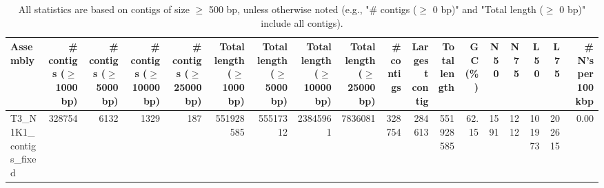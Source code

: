 \documentclass[12pt,a4paper]{article}
\begin{document}
\begin{table}[ht]
\begin{center}
\caption{All statistics are based on contigs of size $\geq$ 500 bp, unless otherwise noted (e.g., "\# contigs ($\geq$ 0 bp)" and "Total length ($\geq$ 0 bp)" include all contigs).}
\begin{tabular}{|l*{17}{|r}|}
\hline
Assembly & \# contigs ($\geq$ 1000 bp) & \# contigs ($\geq$ 5000 bp) & \# contigs ($\geq$ 10000 bp) & \# contigs ($\geq$ 25000 bp) & Total length ($\geq$ 1000 bp) & Total length ($\geq$ 5000 bp) & Total length ($\geq$ 10000 bp) & Total length ($\geq$ 25000 bp) & \# contigs & Largest contig & Total length & GC (\%) & N50 & N75 & L50 & L75 & \# N's per 100 kbp \\ \hline
T3\_N1K1\_contigs\_fixed & 328754 & 6132 & 1329 & 187 & 551928585 & 55517312 & 23845961 & 7836081 & 328754 & 284613 & 551928585 & 62.15 & 1591 & 1212 & 101973 & 202615 & 0.00 \\ \hline
\end{tabular}
\end{center}
\end{table}
\end{document}
